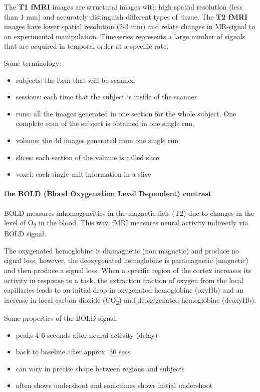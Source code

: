 \documentclass[12pt,article,oneside,a4paper]{memoir}
\begin{document}
The \textbf{T1 fMRI} images are structural images with high spatial resolution 
(less than 1 mm) and accurately distinguish different types of tissue. The \textbf{T2
fMRI} images have lower spatial resolution (2-3 mm) and relate changes in MR-signal 
to an experimental manipulation. Timeseries represents a large number of signals that 
are acquired in temporal order at a specific rate.

Some terminology:
\begin{itemize}
\item subjects: the item that will be scanned
\item sessions: each time that the subject is inside of the scanner
\item runs: all the images generated in one section for the whole subject.
One complete scan of the subject is obtained in one single run.
\item volume: the 3d images generated from one single run
\item slices: each section of the volume is called slice.
\item voxel: each single unit information in a slice
\end{itemize}

\paragraph{the BOLD (Blood Oxygenation Level Dependent) contrast}\label{bold-fmri}
BOLD measures inhomogeneities in the magnetic fiels (T2) due to changes in the level of
O\textsubscript{2} in the blood. This way, fMRI measures neural activity indirectly via
BOLD signal.

The oxygenated hemoglobine is diamagnetic (non magnetic) and produce no signal loss,
however, the deoxygenated hemoglobine is paramagnetic (magnetic) and then produce a
signal loss. When a specific region of the cortex increases its activity in response
to a task, the extraction fraction of oxygen from the local capillaries leads to an
initial drop in oxygenated hemoglobine (oxyHb) and an increase in local carbon dioxide
(CO\textsubscript{2}) and deoxygenated hemoglobine (deoxyHb).

Some properties of the BOLD signal:
\begin{itemize}
\item peaks 4-6 seconds after neural activity (delay)
\item back to baseline after approx. 30 secs
\item can vary in precise shape between regions and subjects
\item often shows undershoot and sometimes shows initial undershoot
\end{itemize}
\end{document}
